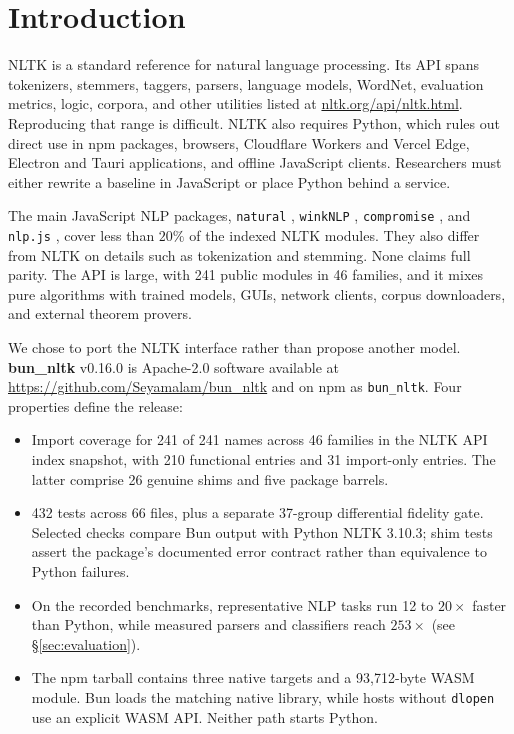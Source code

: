 \documentclass[pdflatex,sn-mathphys-num]{sn-jnl}
\theoremstyle{thmstyleone}
\begin{document}

\maketitle

\section{Introduction}\label{sec:intro}

NLTK \cite{bird2009nltk,loper2002nltk} is a standard reference for natural language processing. Its API spans tokenizers, stemmers, taggers, parsers, language models, WordNet, evaluation metrics, logic, corpora, and other utilities listed at \url{nltk.org/api/nltk.html}. Reproducing that range is difficult. NLTK also requires Python, which rules out direct use in npm packages, browsers, Cloudflare Workers and Vercel Edge, Electron and Tauri applications, and offline JavaScript clients. Researchers must either rewrite a baseline in JavaScript or place Python behind a service.

The main JavaScript NLP packages, \texttt{natural} \cite{natural2024}, \texttt{winkNLP} \cite{winknlp2024}, \texttt{compromise} \cite{compromise2024}, and \texttt{nlp.js} \cite{nlpjs2024}, cover less than $20\%$ of the indexed NLTK modules. They also differ from NLTK on details such as tokenization and stemming. None claims full parity. The API is large, with 241 public modules in 46 families, and it mixes pure algorithms with trained models, GUIs, network clients, corpus downloaders, and external theorem provers.

We chose to port the NLTK interface rather than propose another model. \textbf{bun\_nltk} v0.16.0 is Apache-2.0 software available at \url{https://github.com/Seyamalam/bun_nltk} and on npm as \texttt{bun\_nltk}. Four properties define the release:

\begin{itemize}[leftmargin=1.2em,itemsep=1pt]
  \item Import coverage for 241 of 241 names across 46 families in the NLTK API index snapshot, with 210 functional entries and 31 import-only entries. The latter comprise 26 genuine shims and five package barrels.
  \item 432 tests across 66 files, plus a separate 37-group differential fidelity gate. Selected checks compare Bun output with Python NLTK 3.10.3; shim tests assert the package's documented error contract rather than equivalence to Python failures.
  \item On the recorded benchmarks, representative NLP tasks run 12 to $20\times$ faster than Python, while measured parsers and classifiers reach $253\times$ (see \S\ref{sec:evaluation}).
  \item The npm tarball contains three native targets and a 93{,}712-byte WASM module. Bun loads the matching native library, while hosts without \texttt{dlopen} use an explicit WASM API. Neither path starts Python.
\end{itemize}
\end{document}
